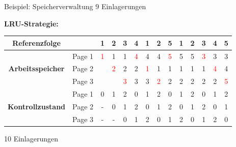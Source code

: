 \documentclass[german]{spicker}
\begin{document}
\begin{bonus}{Beispiel: Speicherverwaltung}
    9 Einlagerungen

    \textbf{LRU-Strategie:}

    \begin{tabular}{|c|c|c|c|c|c|c|c|c|c|c|c|c|c|}
        \hline
        \multicolumn{1}{|c}{\textbf{Referenzfolge}} & \multicolumn{1}{c|}{} & 1                  & 2                  & 3                  & 4                  & 1                  & 2                  & 5                  & 1 & 2 & 3                  & 4                  & 5                  \\
        \hline
        \hline
        \multirow{3}{*}{\textbf{Arbeitsspeicher}}   & Page 1                & \textcolor{red}{1} & 1                  & 1                  & \textcolor{red}{4} & 4                  & 4                  & \textcolor{red}{5} & 5 & 5 & \textcolor{red}{3} & 3                  & 3                  \\
                                                    & Page 2                &                    & \textcolor{red}{2} & 2                  & 2                  & \textcolor{red}{1} & 1                  & 1                  & 1 & 1 & 1                  & \textcolor{red}{4} & 4                  \\
                                                    & Page 3                &                    &                    & \textcolor{red}{3} & 3                  & 3                  & \textcolor{red}{2} & 2                  & 2 & 2 & 2                  & 2                  & \textcolor{red}{5} \\
        \hline
        \hline
        \multirow{3}{*}{\textbf{Kontrollzustand}}   & Page 1                & 0                  & 1                  & 2                  & 0                  & 1                  & 2                  & 0                  & 1 & 2 & 0                  & 1                  & 2                  \\
                                                    & Page 2                & -                  & 0                  & 1                  & 2                  & 0                  & 1                  & 2                  & 0 & 1 & 2                  & 0                  & 1                  \\
                                                    & Page 3                & -                  & -                  & 0                  & 1                  & 2                  & 0                  & 1                  & 2 & 0 & 1                  & 2                  & 0                  \\
        \hline
    \end{tabular}

    10 Einlagerungen
\end{bonus}
\end{document}
